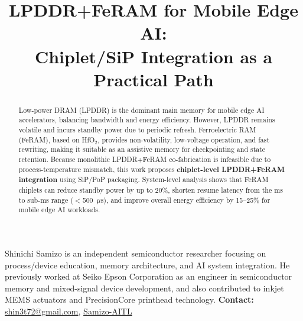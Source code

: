 \documentclass[10pt,conference]{IEEEtran}
\title{LPDDR+FeRAM for Mobile Edge AI:\\
Chiplet/SiP Integration as a Practical Path}
\author{%
  \IEEEauthorblockN{Shinichi Samizo}%
  \IEEEauthorblockA{Independent Semiconductor Researcher\\
  Former Engineer, Seiko Epson Corporation\\
  Email: \href{mailto:shin3t72@gmail.com}{shin3t72@gmail.com}\\
  GitHub: \href{https://github.com/Samizo-AITL}{Samizo-AITL}}%
}
\begin{document}
\maketitle

\begin{abstract}
Low-power DRAM (LPDDR) is the dominant main memory for mobile edge AI accelerators, balancing bandwidth and energy efficiency. 
However, LPDDR remains volatile and incurs standby power due to periodic refresh. 
Ferroelectric RAM (FeRAM), based on HfO$_2$, provides non-volatility, low-voltage operation, and fast rewriting, making it suitable as an assistive memory for checkpointing and state retention. 
Because monolithic LPDDR+FeRAM co-fabrication is infeasible due to process-temperature mismatch, this work proposes \textbf{chiplet-level LPDDR+FeRAM integration} using SiP/PoP packaging. 
System-level analysis shows that FeRAM chiplets can reduce standby power by up to 20\%, shorten resume latency from the ms to sub-ms range ($<$500~$\mu$s), and improve overall energy efficiency by 15--25\% for mobile edge AI workloads.
\end{abstract}










\begingroup\small
\vspace{0.25\baselineskip}
\begin{IEEEbiographynophoto}{Shinichi Samizo}
is an independent semiconductor researcher focusing on process/device education, memory architecture, and AI system integration. 
He previously worked at Seiko Epson Corporation as an engineer in semiconductor memory and mixed-signal device development, and also contributed to inkjet MEMS actuators and PrecisionCore printhead technology. 
\textbf{Contact:} \href{mailto:shin3t72@gmail.com}{shin3t72@gmail.com}, 
\href{https://github.com/Samizo-AITL}{Samizo-AITL}
\end{IEEEbiographynophoto}
\endgroup
\end{document}
